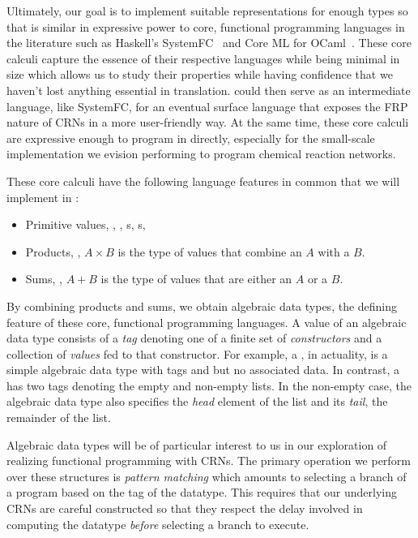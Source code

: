 Ultimately, our goal is to implement suitable representations for enough types so that \reactamole is similar in expressive power to core, functional programming languages in the literature such as Haskell's SystemFC~\cite{weirich:2013:fc} and Core ML for OCaml~\cite{remy:2001:ocaml}.
These core calculi capture the essence of their respective languages while being minimal in size which allows us to study their properties while having confidence that we haven't lost anything essential in translation.
\reactamole could then serve as an intermediate language, like SystemFC, for an eventual surface language that exposes the FRP nature of CRNs in a more user-friendly way.
At the same time, these core calculi are expressive enough to program in directly, especially for the small-scale implementation we evision performing to program chemical reaction networks.

These core calculi have the following language features in common that we will implement in \reactamole:
\begin{itemize}[itemsep=0pt]
  \item Primitive values, \eg, , s, s, \etc
  \item Products, \ie, \( A \times B \) is the type of values that combine an \( A \) with a \( B \).
  \item Sums, \ie, \( A + B \) is the type of values that are either an \( A \) or a \( B \).
\end{itemize}
By combining products and sums, we obtain algebraic data types, the defining feature of these core, functional programming languages.
A value of an algebraic data type consists of a \emph{tag} denoting one of a finite set of \emph{constructors} and a collection of \emph{values} fed to that constructor.
For example, a , in actuality, is a simple algebraic data type with tags  and  but no associated data.
In contrast, a  has two tags denoting the empty and non-empty lists.
In the non-empty case, the algebraic data type also specifies the \emph{head} element of the list and its \emph{tail}, the remainder of the list.

Algebraic data types will be of particular interest to us in our exploration of realizing functional programming with CRNs.
The primary operation we perform over these structures is \emph{pattern matching} which amounts to selecting a branch of a program based on the tag of the datatype.
This requires that our underlying CRNs are careful constructed so that they respect the delay involved in computing the datatype \emph{before} selecting a branch to execute.

